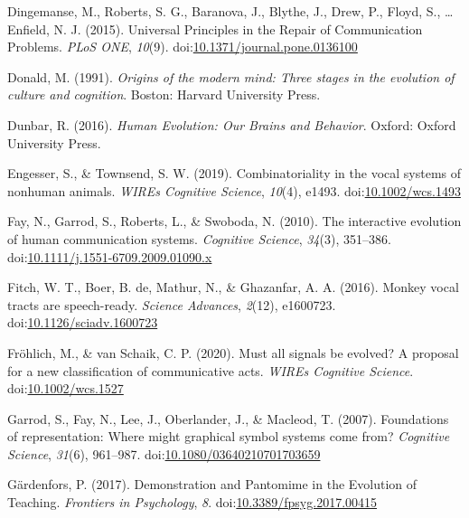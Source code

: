 \documentclass[
  man, noextraspace,floatsintext]{apa6}
\newlength{\cslhangindent}
\newenvironment{cslreferences}%
  {\setlength{\parindent}{0pt}%
  \everypar{\setlength{\hangindent}{\cslhangindent}}\ignorespaces}%
  {\par}
\begin{document}
\begin{cslreferences}
\leavevmode\hypertarget{ref-dingemanseUniversalPrinciplesRepair2015}{}%
Dingemanse, M., Roberts, S. G., Baranova, J., Blythe, J., Drew, P., Floyd, S., \ldots{} Enfield, N. J. (2015). Universal Principles in the Repair of Communication Problems. \emph{PLoS ONE}, \emph{10}(9). doi:\href{https://doi.org/10.1371/journal.pone.0136100}{10.1371/journal.pone.0136100}

\leavevmode\hypertarget{ref-donaldOriginsModernMind1991}{}%
Donald, M. (1991). \emph{Origins of the modern mind: Three stages in the evolution of culture and cognition}. Boston: Harvard University Press.

\leavevmode\hypertarget{ref-dunbarHumanEvolutionOur2016}{}%
Dunbar, R. (2016). \emph{Human Evolution: Our Brains and Behavior}. Oxford: Oxford University Press.

\leavevmode\hypertarget{ref-engesserCombinatorialityVocalSystems2019}{}%
Engesser, S., \& Townsend, S. W. (2019). Combinatoriality in the vocal systems of nonhuman animals. \emph{WIREs Cognitive Science}, \emph{10}(4), e1493. doi:\href{https://doi.org/10.1002/wcs.1493}{10.1002/wcs.1493}

\leavevmode\hypertarget{ref-fayInteractiveEvolutionHuman2010}{}%
Fay, N., Garrod, S., Roberts, L., \& Swoboda, N. (2010). The interactive evolution of human communication systems. \emph{Cognitive Science}, \emph{34}(3), 351--386. doi:\href{https://doi.org/10.1111/j.1551-6709.2009.01090.x}{10.1111/j.1551-6709.2009.01090.x}

\leavevmode\hypertarget{ref-fitchMonkeyVocalTracts2016}{}%
Fitch, W. T., Boer, B. de, Mathur, N., \& Ghazanfar, A. A. (2016). Monkey vocal tracts are speech-ready. \emph{Science Advances}, \emph{2}(12), e1600723. doi:\href{https://doi.org/10.1126/sciadv.1600723}{10.1126/sciadv.1600723}

\leavevmode\hypertarget{ref-frohlichMustAllSignals2020}{}%
Fröhlich, M., \& van Schaik, C. P. (2020). Must all signals be evolved? A proposal for a new classification of communicative acts. \emph{WIREs Cognitive Science}. doi:\href{https://doi.org/10.1002/wcs.1527}{10.1002/wcs.1527}

\leavevmode\hypertarget{ref-garrodFoundationsRepresentationWhere2007}{}%
Garrod, S., Fay, N., Lee, J., Oberlander, J., \& Macleod, T. (2007). Foundations of representation: Where might graphical symbol systems come from? \emph{Cognitive Science}, \emph{31}(6), 961--987. doi:\href{https://doi.org/10.1080/03640210701703659}{10.1080/03640210701703659}

\leavevmode\hypertarget{ref-gardenforsDemonstrationPantomimeEvolution2017}{}%
Gärdenfors, P. (2017). Demonstration and Pantomime in the Evolution of Teaching. \emph{Frontiers in Psychology}, \emph{8}. doi:\href{https://doi.org/10.3389/fpsyg.2017.00415}{10.3389/fpsyg.2017.00415}


\end{cslreferences}
\end{document}

